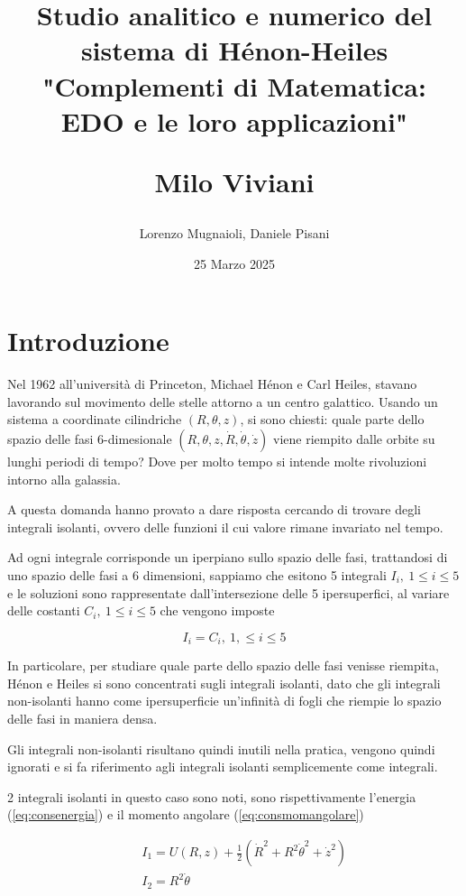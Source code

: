 \documentclass[a4paper]{article}
\title{
	Studio analitico e numerico del sistema di Hénon-Heiles\\
	\vspace{1cm}	
	"Complementi di Matematica: EDO e le loro applicazioni"\\
	\begin{large}
		Milo Viviani
	\end{large}
	\vspace{1cm}

}
\date{25 Marzo 2025}
\author{Lorenzo Mugnaioli, Daniele Pisani}
\numberwithin{equation}{section}
\numberwithin{figure}{section}
\begin{document}
\maketitle
\clearpage
\tableofcontents
\clearpage

\section{Introduzione}
Nel 1962 all'università di Princeton, Michael Hénon e  Carl Heiles,
stavano lavorando sul movimento delle stelle attorno a un centro galattico.
Usando un sistema a coordinate cilindriche $(R,\theta,z)$, si sono chiesti:
quale parte dello spazio delle fasi 6-dimesionale $(R,\theta,z, \dot{R},\dot{\theta}, \dot{z})$
viene riempito dalle orbite su lunghi periodi di tempo?\cite{1964henonheiles}
Dove per molto tempo si intende molte rivoluzioni intorno alla galassia.

A questa domanda hanno provato a dare risposta cercando di trovare degli integrali isolanti,
ovvero delle funzioni il cui valore rimane invariato nel tempo.

Ad ogni integrale corrisponde un iperpiano sullo spazio delle fasi, trattandosi di uno spazio
delle fasi a 6 dimensioni, sappiamo che esitono 5 integrali $I_i,\ 1\le i\le 5$ e le soluzioni
sono rappresentate dall'intersezione delle 5 ipersuperfici, al variare delle costanti
$C_i,\ 1\le i\le 5$ che vengono imposte

\begin{equation}
	I_i = C_i,\ 1,\le i\le 5
\end{equation}

In particolare, per studiare quale parte dello spazio delle fasi venisse riempita, Hénon e Heiles
si sono concentrati sugli integrali isolanti, dato che gli integrali non-isolanti hanno come
ipersuperficie un'infinità di fogli che riempie lo spazio delle fasi in maniera
densa\cite{1964henonheiles}.

Gli integrali non-isolanti risultano quindi inutili nella pratica, vengono quindi ignorati e
si fa riferimento agli integrali isolanti semplicemente come integrali.

2 integrali isolanti in questo caso sono noti, sono rispettivamente l'energia (\ref{eq:consenergia})
e il momento angolare (\ref{eq:consmomangolare})

\begin{eqnarray}
	&&I_1 = U(R,z) + \frac{1}{2}(\dot{R}^2+R^2\dot{\theta}^2+\dot{z}^2) \label{eq:consenergia}\\
	&&I_2 = R^2\dot{\theta} \label{eq:consmomangolare}
\end{eqnarray}
\end{document}
